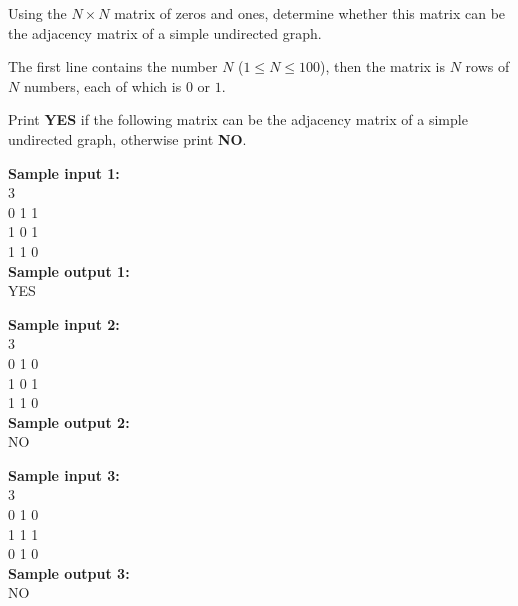 \documentclass[a4paper]{article}
\begin{document}
Using the $N \times N$ matrix of zeros and ones, determine whether this matrix can be the adjacency matrix of a simple undirected graph.

The first line contains the number $N$ ($1 \le N \le 100$), then the matrix is $N$ rows of $N$ numbers, each of which is $0$ or $1$.

Print \textbf{YES} if the following matrix can be the adjacency matrix of a simple undirected graph, otherwise print \textbf{NO}.

\LINE

\noindent \textbf{Sample input 1:}\\
3\\
0 1 1\\
1 0 1\\
1 1 0\\

\noindent \textbf{Sample output 1:}\\
YES

\SPACE

\noindent \textbf{Sample input 2:}\\
3\\
0 1 0\\
1 0 1\\
1 1 0\\

\noindent \textbf{Sample output 2:}\\
NO

\SPACE

\noindent \textbf{Sample input 3:}\\
3\\
0 1 0\\
1 1 1\\
0 1 0\\

\noindent \textbf{Sample output 3:}\\
NO
\end{document}
